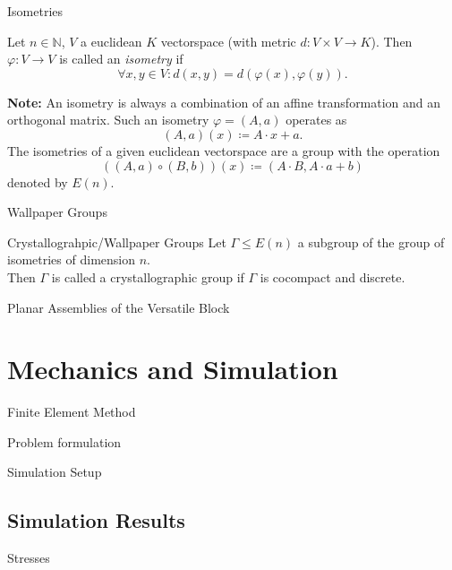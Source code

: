 \documentclass{beamer}
\numberwithin{equation}{aufgabe}
\newcommand\N{\mathbb N}
\renewcommand{\phi}{\varphi}
\begin{document}
\begin{frame}{Isometries}
    \begin{definition}
        Let $n \in \N$, $V$ a euclidean $K$ vectorspace (with metric $d: V \times V \to K$).
        Then $\phi: V \to V$ is called an \emph{isometry} if 
        $$
            \forall x, y \in V : d(x, y) = d(\phi(x), \phi(y)).
        $$
    \end{definition}
    \textbf{Note:} An isometry is always a combination of an affine transformation and an orthogonal matrix. Such an isometry $\phi = (A, a)$ operates as 
    $$
        (A, a)(x) \coloneqq A \cdot x + a.
    $$
    The isometries of a given euclidean vectorspace are a group with the operation 
    $$
        \left( (A, a) \circ (B, b) \right) (x) \coloneqq (A \cdot B, A\cdot a + b)
    $$
    denoted by $E(n)$.
\end{frame}
\begin{frame}{Wallpaper Groups}
    \begin{definition}{Crystallograhpic/Wallpaper Groups}
        Let $\Gamma \leq E(n)$ a subgroup of the group of isometries of dimension $n$.\\
        Then $\Gamma$ is called a crystallographic group if $\Gamma$ is cocompact and discrete.
    \end{definition}
\end{frame}
\begin{frame}{Planar Assemblies of the Versatile Block}

\end{frame}

\section{Mechanics and Simulation}
\begin{frame}{Finite Element Method}
    
\end{frame}

\begin{frame}{Problem formulation}

\end{frame}

\begin{frame}{Simulation Setup}
    
\end{frame}

\subsection{Simulation Results}
\begin{frame}{Stresses}
    
\end{frame}
\end{document}
